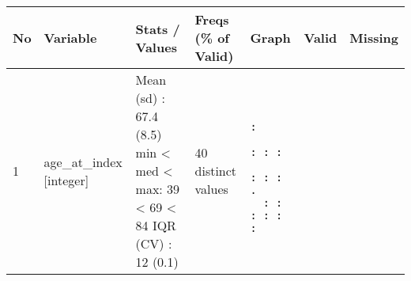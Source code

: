 \documentclass[
]{article}
\begin{document}
\begin{longtable}[]{@{}lllllll@{}}
\toprule
\begin{minipage}[b]{0.03\columnwidth}\raggedright
No\strut
\end{minipage} & \begin{minipage}[b]{0.17\columnwidth}\raggedright
Variable\strut
\end{minipage} & \begin{minipage}[b]{0.17\columnwidth}\raggedright
Stats / Values\strut
\end{minipage} & \begin{minipage}[b]{0.14\columnwidth}\raggedright
Freqs (\% of Valid)\strut
\end{minipage} & \begin{minipage}[b]{0.15\columnwidth}\raggedright
Graph\strut
\end{minipage} & \begin{minipage}[b]{0.07\columnwidth}\raggedright
Valid\strut
\end{minipage} & \begin{minipage}[b]{0.07\columnwidth}\raggedright
Missing\strut
\end{minipage}\tabularnewline
\midrule
\endhead
\begin{minipage}[t]{0.03\columnwidth}\raggedright
1\strut
\end{minipage} & \begin{minipage}[t]{0.17\columnwidth}\raggedright
age\_at\_index
{[}integer{]}\strut
\end{minipage} & \begin{minipage}[t]{0.17\columnwidth}\raggedright
Mean (sd) : 67.4 (8.5)
min \textless{} med \textless{} max:
39 \textless{} 69 \textless{} 84
IQR (CV) : 12 (0.1)\strut
\end{minipage} & \begin{minipage}[t]{0.14\columnwidth}\raggedright
40 distinct values\strut
\end{minipage} & \begin{minipage}[t]{0.15\columnwidth}\raggedright
\begin{verbatim}
          :
      : : :
      : : : .
  : : : : : :
\end{verbatim}


\end{minipage}
\end{longtable}
\end{document}
